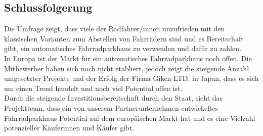 \subsection{Schlussfolgerung}

Die Umfrage zeigt, dass viele der Radfahrer/innen unzufrieden mit den klassischen Varianten zum Abstellen von Fahrrädern sind und es Bereitschaft gibt, ein automatisches Fahrradparkhaus zu verwenden und dafür zu zahlen.\\
In Europa ist der Markt für ein automatisches Fahrradparkhaus noch offen. Die Mitbewerber haben sich noch nicht etabliert, jedoch zeigt die steigende Anzahl umgesetzter Projekte und der Erfolg der Firma Giken LTD. in Japan, dass es sich um einen Trend handelt und noch viel Potential offen ist.\\
Durch die steigende Investitionsbereitschaft durch den Staat, sieht das Projektteam, dass ein von unserem Partnerunternehmen entwickeltes Fahrradparkhaus Potential auf dem europäischen Markt hat und es eine Vielzahl potenzieller Käuferinnen und Käufer gibt.\\
